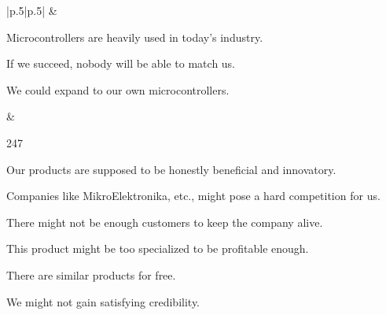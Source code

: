 \documentclass[a4paper,twoside,15pt]{book}
\begin{document}
\begin{table}[h!]
\begin{tabular}{|p{}|p{}|}
                    &  \\

                \begin{dinglist}{73}
                    \setlength{\itemsep}{-3pt}
                    \item Microcontrollers are heavily used in today's industry.
                    \item If we succeed, nobody will be able to match us.
                    \item We could expand to our own microcontrollers.
                \end{dinglist}  &

                \begin{dinglist}{247}
                    \setlength{\itemsep}{-3pt}
                    \item Our products are supposed to be honestly beneficial and innovatory.
                    \item Companies like MikroElektronika, etc., might pose a hard competition for us.
                    \item There might not be enough customers to keep the company alive.
                    \item This product might be too specialized to be profitable enough.
                    \item There are similar products for free.
                    \item We might not gain satisfying credibility.
                \end{dinglist}  \\
                \hline
            \end{tabular}
            \caption{SWOT analysis}
        \end{table}
\end{document}
